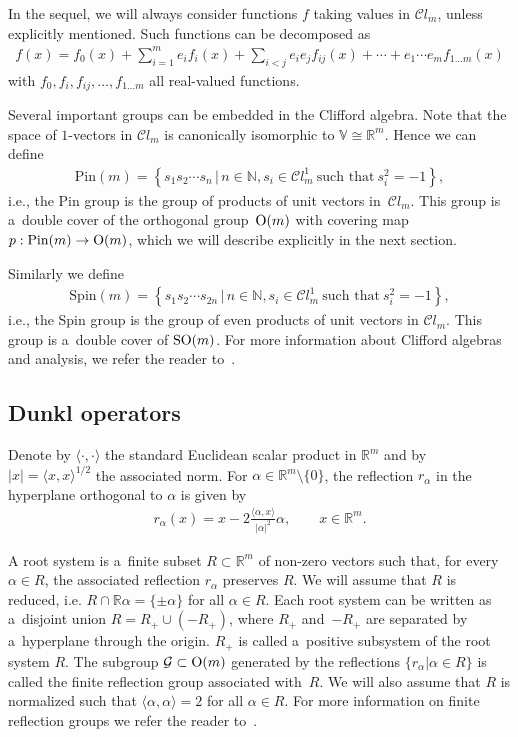 \documentclass[pdftex]{sigma}
\numberwithin{equation}{section}
\numberwithin{theorem}{section}
\numberwithin{proposition}{section}
\numberwithin{lemma}{section}
\numberwithin{corollary}{section}
\numberwithin{definition}{section}
\numberwithin{example}{section}
\numberwithin{remark}{section}
\numberwithin{note}{section}
\theoremstyle{remark}
\newcommand{\mR}{\mathbb{R}}
\newcommand{\mN}{\mathbb{N}}
\newcommand{\mV}{\mathbb{V}}
\newcommand{\cC}{\mathcal{C}}
\newcommand{\cG}{\mathcal{G}}
\begin{document}
In the sequel, we will always consider functions $f$ taking values in $\cC l_{m}$, unless
explicitly mentioned.
Such functions can be decomposed as
\begin{gather*}%
f(x)=f_{0}(x)+\sum_{i=1}^{m}e_{i}f_{i}(x)+\sum_{i<j}e_{i}e_{j}f_{ij}(x)+\cdots+e_{1}
\cdots e_{m}f_{1\ldots m}(x)
\end{gather*}
with $f_{0},f_{i},f_{ij},\ldots,f_{1\ldots m}$ all real-valued functions.

Several important groups can be embedded in the Clif\/ford algebra.
Note that the space of $1$-vectors in $\cC l_{m}$ is canonically isomorphic to $\mV\cong\mR^{m}$.
Hence we can def\/ine
\begin{gather*}
\mathrm{Pin}(m)=\left\{s_{1}s_{2}\cdots s_{n}\,|\,n\in\mN,s_{i}\in\cC l_{m}^{1}\ \text{such that}\ s_{i}^{2}=-1\right\},
\end{gather*}
i.e., the Pin group is the group of products of unit vectors in~$\cC l_{m}$.
This group is a~double cover of the orthogonal group~${\rm O}(m)$ with covering map $p:\mathrm{Pin}(m)
\rightarrow {\rm O}(m)$, which we will describe explicitly in the next section.

Similarly we def\/ine
\begin{gather*}
\mathrm{Spin}(m)=\left\{s_{1}s_{2}\cdots s_{2n}\,|\,n\in\mN,s_{i}\in\cC l_{m}^{1} \ \text{such that} \ s_{i}^{2}=-1\right\},
\end{gather*}
i.e., the Spin group is the group of even products of unit vectors in $\cC l_{m}$.
This group is a~double cover of ${\rm SO}(m)$.
For more information about Clif\/ford algebras and analysis, we refer the reader to~\cite{MR1169463,MR1130821}.

\subsection{Dunkl operators}\label{section2.2}
Denote by $\langle\cdot,\cdot
\rangle$ the standard Euclidean scalar product in $\mR^{m}$ and by $|x|=\langle x,
x\rangle^{1/2}$ the associated norm.
For $\alpha\in\mR^{m}\setminus \{0\}$, the ref\/lection $r_{\alpha}$ in the hyperplane orthogonal to
$\alpha$ is given by
\begin{gather*}
r_{\alpha}(x)=x-2\frac{\langle\alpha,x\rangle}{|\alpha|^{2}}\alpha,\qquad x\in\mR^{m}.
\end{gather*}

A root system is a~f\/inite subset $R\subset\mR^{m}$ of non-zero vectors such that, for every
$\alpha\in R$, the associated ref\/lection $r_{\alpha}$ preserves $R$.
We will assume that $R$ is reduced, i.e.
$R\cap\mR\alpha=\{\pm\alpha\}$ for all $\alpha\in R$.
Each root system can be written as a~disjoint union $R=R_{+}\cup(-R_{+})$, where $R_{+}$ and~$-R_{+}$ are separated by a~hyperplane through the origin.
$R_+$ is called a~positive subsystem of the root system $R$.
The subgroup $\cG\subset {\rm O}(m)$ generated by the ref\/lections $\{r_{\alpha}|\alpha\in R\}$ is
called the f\/inite ref\/lection group associated with~$R$.
We will also assume that $R$ is normalized such that $\langle\alpha,\alpha\rangle=2$ for all
$\alpha\in R$.
For more information on f\/inite ref\/lection groups we refer the reader to~\cite{Humph}.
\end{document}
